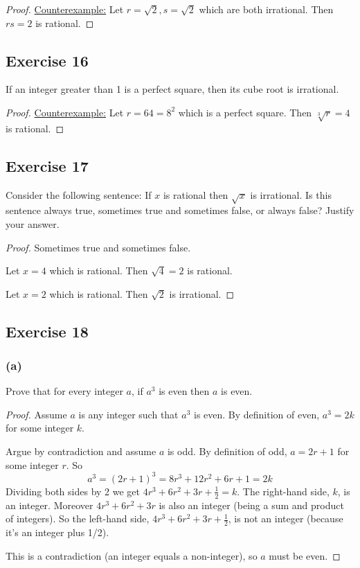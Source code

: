 \documentclass[14pt]{extarticle}
\begin{document}
\begin{proof}
    \underline{Counterexample:} Let $r = \sqrt{2}, s = \sqrt{2}$ which are both irrational. Then $rs = 2$ is rational.
\end{proof}

\subsection{Exercise 16}
If an integer greater than 1 is a perfect square, then its cube root is irrational.

\begin{proof}
    \underline{Counterexample:} Let $r = 64 = 8^2$ which is a perfect square. Then $\sqrt[3]{r} = 4$ is rational.
\end{proof}

\subsection{Exercise 17}
Consider the following sentence: If $x$ is rational then $\sqrt{x}$ is irrational. Is this sentence always true, sometimes true and sometimes false, or always false? Justify your answer.

\begin{proof}
    Sometimes true and sometimes false.

    Let $x = 4$ which is rational. Then $\sqrt{4} = 2$ is rational.

    Let $x = 2$ which is rational. Then $\sqrt{2}$ is irrational.
\end{proof}

\subsection{Exercise 18}
\subsubsection{(a)}
Prove that for every integer $a$, if $a^3$ is even then $a$ is even.

\begin{proof}
    Assume $a$ is any integer such that $a^3$ is even. By definition of even, $a^3 = 2k$ for some integer $k$.

    Argue by contradiction and assume $a$ is odd. By definition of odd, $a = 2r+1$ for some integer $r$. So
    \[
        a^3 = (2r+1)^3 = 8r^3 + 12r^2 + 6r + 1 = 2k
    \]
    Dividing both sides by 2 we get $4r^3 + 6r^2 + 3r + \frac{1}{2} = k$. The right-hand side, $k$, is an integer. Moreover $4r^3 + 6r^2 + 3r$ is also an integer (being a sum and product of integers). So the left-hand side, $4r^3 + 6r^2 + 3r + \frac{1}{2}$, is not an integer (because it's an integer plus 1/2).

    This is a contradiction (an integer equals a non-integer), so $a$ must be even.
\end{proof}
\end{document}
